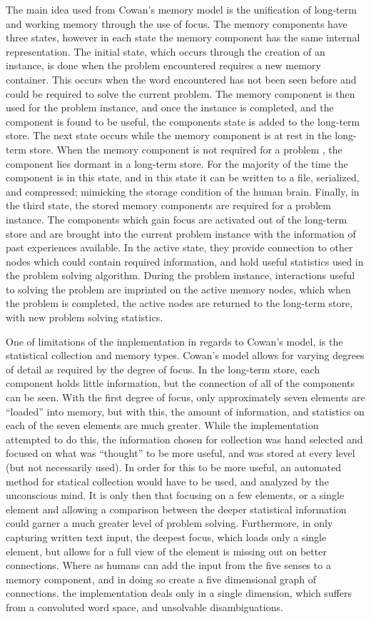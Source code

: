 The main idea used from Cowan's memory model is the unification of long-term and working memory through the use of focus.  The memory components have three states, however in each state the memory component has the same internal representation. The initial state, which occurs through the creation of an instance, is done when the problem encountered requires a new memory container.  This occurs when the word encountered has not been seen before and could be required to solve the current problem. The memory component is then used for the problem instance, and once the instance is completed, and the component is found to be useful, the components state is added to the long-term store. The next state occurs while the memory component is at rest in the long-term store. When the memory component is not required for a problem , the component lies dormant in a long-term store. For the majority of the time the component is in this state, and in this state it can be written to a file, serialized, and compressed; mimicking the storage condition of the human brain. Finally, in the third state, the stored memory components are required for a problem instance. The components which gain focus are activated out of the long-term store and are brought into the current problem instance with the information of past experiences available. In the active state, they provide connection to other nodes which could contain required information, and hold useful statistics used in the problem solving algorithm.  During the problem instance, interactions useful to solving the problem are imprinted on the active memory nodes, which when the problem is completed, the active nodes are returned to the long-term store, with new problem solving statistics.  

One of limitations of the implementation in regards to Cowan's model, is the statistical collection and memory types.  Cowan's model allows for varying degrees of detail as required by the degree of focus.  In the long-term store, each component holds little information, but the connection of all of the components can be seen.  With the first degree of focus, only approximately seven elements are ``loaded'' into memory, but with this, the amount of information, and statistics on each of the seven elements are much greater.  While the implementation attempted to do this, the information chosen for collection was hand selected and focused on what was ``thought'' to be more useful, and was stored at every level (but not necessarily used).  In order for this to be more useful, an automated method for statical collection would have to be used, and analyzed by the unconscious mind.  It is only then that focusing on a few elements, or a single element and allowing a comparison between the deeper statistical information could garner a much greater level of problem solving. Furthermore, in only capturing written text input, the deepest focus, which loads only a single element, but allows for a full view of the element is missing out on better connections.  Where as humans can add the input from the five senses to a memory component, and in doing so create a five dimensional graph of connections. the implementation deals only in a single dimension, which suffers from a convoluted word space, and unsolvable disambiguations.

